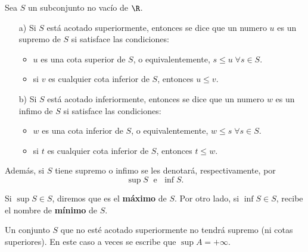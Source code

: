 \begin{definition}
	Sea \(S \) un subconjunto no vacío de \(\R \).
	\begin{enumerate}
		\item[a)] Si \(S \) está acotado superiormente, entonces se dice que un numero \(u \) es un supremo de \(S \) si satisface las condiciones:
			\begin{itemize}
				\item \(u \) es una cota superior de \(S \), o equivalentemente, \(s \leq u \;\forall s \in S \).
				\item si \(v \) es cualquier cota inferior de \(S \), entonces \(u \leq v \).
			\end{itemize}
		\item[b)] Si \(S \) está acotado inferiormente, entonces se dice que un numero \(w \) es un infimo de \(S\) si satisface las condiciones: \begin{itemize}
				\item \(w \) es una cota inferior de \(S \), o equivalentemente, \(w \leq s \; \forall s \in S \).
				\item si \(t \) es cualquier cota inferior de \(S \), entonces \(t \leq w \).
			\end{itemize}
	\end{enumerate}
	
	Además, si \(S \) tiene supremo o infimo se les denotará, respectivamente, por
	\[
		\sup S \;\text{ e } \;\inf S .
	\]
\end{definition}
Si \(\sup S \in S\), diremos que es el \textbf{máximo}  de \(S \). Por otro lado, si \(\inf S \in S \), recibe el nombre de \textbf{mínimo}  de \(S \).

Un conjunto \(S \) que no esté acotado superiormente no tendrá supremo (ni cotas superiores). En este caso a veces se escribe que \(\sup A = + \infty \).
